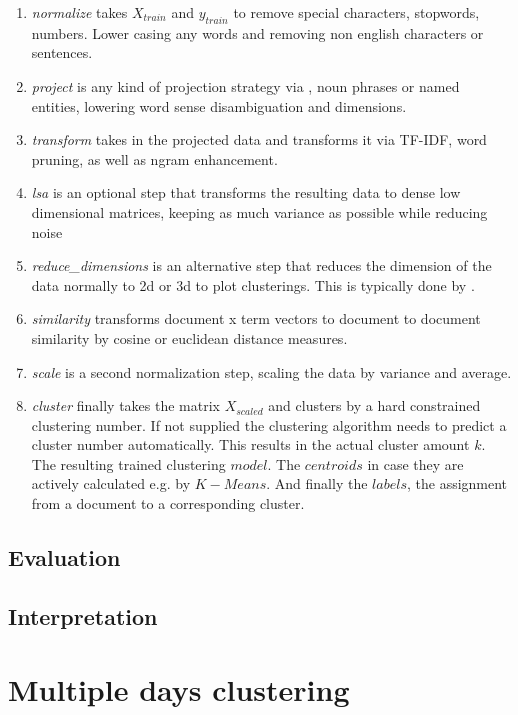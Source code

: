     \begin{enumerate}
      \item \emph{normalize} takes $X_{train}$ and $y_{train}$ to remove special characters, stopwords, numbers. Lower casing any words and removing non english characters or sentences. 
      \item \emph{project} is any kind of projection strategy via \wordnet{}, noun phrases or named entities, lowering word sense disambiguation and dimensions.
      \item \emph{transform} takes in the projected data and transforms it via TF-IDF, word pruning, as well as ngram enhancement.
      \item \emph{lsa} is an optional step that transforms the resulting data to dense low dimensional matrices, keeping as much variance as possible while reducing noise
      \item \emph{reduce\_dimensions} is an alternative step that reduces the dimension of the data normally to 2d or 3d to plot clusterings. This is typically done by \pca{}.
      \item \emph{similarity} transforms document x term vectors to document to document similarity by cosine or euclidean distance measures.
      \item \emph{scale} is a second normalization step, scaling the data by variance and average.
      \item \emph{cluster} finally takes the matrix $X_{scaled}$ and clusters by a hard constrained clustering number. If not supplied the clustering algorithm needs to predict a cluster number automatically. This results in the actual cluster amount $k$. The resulting trained clustering $model$. The $centroids$ in case they are actively calculated e.g. by $K-Means$. And finally the $labels$, the assignment from a document to a corresponding cluster.
    \end{enumerate}

  \subsection{Evaluation}
  \subsection{Interpretation}

\section{Multiple days clustering}


